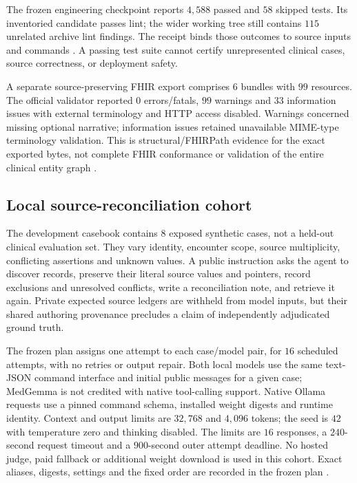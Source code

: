 The frozen engineering checkpoint reports $4{,}588$ passed %
and $58$ skipped tests. %
Its inventoried candidate passes lint; the wider working tree still contains
$115$ unrelated archive lint findings. %
The receipt binds those outcomes to source inputs and commands
\citep{healthcraft_engineering2026}. A passing test suite cannot certify
unrepresented clinical cases, source correctness, or deployment safety.

A separate source-preserving FHIR export comprises $6$ bundles %
with $99$ resources. %
The official validator reported $0$ errors/fatals, %
$99$ warnings and $33$ information issues %
with external terminology and HTTP access disabled. Warnings concerned
missing optional narrative; information issues retained unavailable MIME-type
terminology validation. This is structural/FHIRPath evidence for the exact
exported bytes, not complete FHIR conformance or validation of the entire
clinical entity graph \citep{healthcraft_fhir2026}.

\subsection{Local source-reconciliation cohort}
The development casebook contains $8$ exposed synthetic cases, %
not a held-out clinical evaluation set. They vary identity, encounter scope,
source multiplicity, conflicting assertions and unknown values. A public
instruction asks the agent to discover records, preserve their literal
source values and pointers, record exclusions and unresolved conflicts,
write a reconciliation note, and retrieve it again. Private expected source
ledgers are withheld from model inputs, but their shared authoring provenance
precludes a claim of independently adjudicated ground truth.

The frozen plan assigns one attempt to each case/model pair, for
$16$ scheduled attempts, with no retries or output repair. %
Both local models use the same text-JSON command interface and initial public
messages for a given case; MedGemma is not credited with native tool-calling
support. Native Ollama requests use a pinned command schema, installed weight
digests and runtime identity. Context and output limits are
$32{,}768$ and $4{,}096$ tokens; %
the seed is $42$ with temperature zero and thinking disabled. %
The limits are $16$ responses, a $240$-second request timeout and a %
$900$-second outer attempt deadline. No hosted judge, paid fallback or
additional weight download is used in this cohort. Exact aliases, digests,
settings and the fixed order are recorded in the frozen plan
\citep{healthcraft_local2026}.

